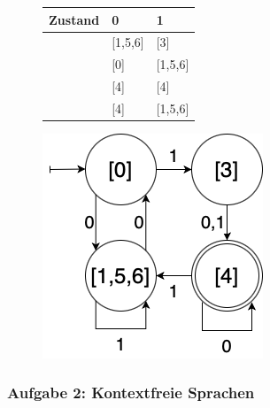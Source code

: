 \begin{teile}
\begin{figure}[ht]
\begin{minipage}[t]{.4\textwidth}
			\hspace*{25pt}
			\begin{tabular}{|l|l|l|}
				\hline
				\textbf{Zustand} & \textbf{0} & \textbf{1} \\
				\hline
				[0]            & [1,5,6]    & [3] \\ 
				\hline
				[1,5,6]        & [0]        & [1,5,6] \\
				\hline
				[3]            & [4]        & [4] \\
				\hline  
				[4]            & [4]        & [1,5,6] \\
				\hline 
			\end{tabular}
		\end{minipage}
		\begin{minipage}[t]{.57\textwidth}
			\vspace*{0pt}
			\hspace*{20pt}
			\includegraphics[scale=0.35]{DEA_T1_A1.png}
		\end{minipage} 
	\end{figure}
	
\end{teile}

\newpage
\subsubsection{Aufgabe 2: Kontextfreie Sprachen}

